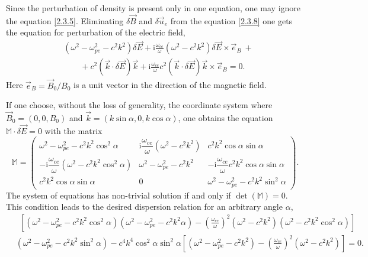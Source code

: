 Since the perturbation of density is present only in one equation, one may ignore the equation \ref{2.3.5}. Eliminating $ \delta \vec{B} $ and $ \delta \vec{u}_{e} $ from the equation \ref{2.3.8} one gets the equation for perturbation of the electric field,
\begin{equation}
\begin{split}
\label{2.3.9}
& \left( \omega^{2} - \omega_{pe}^{2} - c^{2} k^{2} \right) \delta \vec{E} + \mathrm{i} \frac{\omega_{ce}}{\omega} \left( \omega^{2} - c^{2} k^{2} \right) \delta \vec{E} \times \vec{e}_{B} \: + \\[5pt]
& \qquad + c^{2} \left( \vec{k} \cdot \delta \vec{E} \right) \vec{k} + \mathrm{i} \frac{\omega_{ce}}{\omega} c^{2} \left( \vec{k} \cdot \delta \vec{E} \right) \vec{k} \times \vec{e}_{B} = 0.
\end{split}
\end{equation}
Here $ \vec{e}_{B} = \vec{B}_{0}/B_{0} $ is a unit vector in the direction of the magnetic field.

If one choose, without the loss of generality, the coordinate system where $ \vec{B}_{0} = (0, 0, B_{0}) $ and $ \vec{k} = (k \sin \alpha, 0, k \cos \alpha) $, one obtains the equation $ \mathbb{M} \cdot \delta \vec{E} = 0 $ with the matrix
\begingroup
\renewcommand*{\arraystretch}{2.0}
\begin{equation}
\label{2.3.11}
\mathbb{M} =  \begin{pmatrix}
 \omega^{2} - \omega_{pe}^{2} - c^{2} k^{2} \cos^{2} \alpha & \mathrm{i} \dfrac{\omega_{ce}}{\omega} \left( \omega^{2} - c^{2} k^{2} \right)  & c^{2} k^{2} \cos \alpha \sin \alpha \\
 - \mathrm{i} \dfrac{\omega_{ce}}{\omega} \left( \omega^{2} - c^{2} k^{2} \cos^{2} \alpha \right) & \omega^{2} - \omega_{pe}^{2} - c^{2} k^{2} & - \mathrm{i} \dfrac{\omega_{ce}}{\omega} c^{2} k^{2} \cos \alpha \sin \alpha \\
 c^{2} k^{2} \cos \alpha \sin \alpha & 0 & \omega^{2} - \omega_{pe}^{2} - c^{2} k^{2} \sin^{2} \alpha
 \end{pmatrix}.
\end{equation} 
\endgroup
The system of equations has non-trivial solution if and only if $ \det \left( \mathbb{M} \right) = 0 $. This condition leads to the desired dispersion relation for an arbitrary angle $ \alpha $,
\begin{equation}
\begin{split}
\label{2.3.12}
& \ \ \left[ \left( \omega^{2} - \omega_{pe}^{2} - c^{2} k^{2} \cos^{2} \alpha \right) \left( \omega^{2} - \omega_{pe}^{2} - c^{2} k^{2} \alpha \right) - \left(  \frac{\omega_{ce}}{\omega} \right)^{2} \left( \omega^{2} - c^{2} k^{2} \right) \left( \omega^{2} - c^{2} k^{2} \cos^{2} \alpha \right) \right]\\[5pt]
& \left( \omega^{2} - \omega_{pe}^{2} - c^{2} k^{2} \sin^{2} \alpha \right) - c^{4} k^{4} \cos^{2} \alpha \sin^{2} \alpha \left[ \left( \omega^{2} - \omega_{pe}^{2} - c^{2} k^{2} \right) - \left( \frac{\omega_{ce}}{\omega} \right)^{2} \left( \omega^{2} - c^{2} k^{2} \right) \right] = 0.\\[5pt]
\end{split}
\end{equation}

